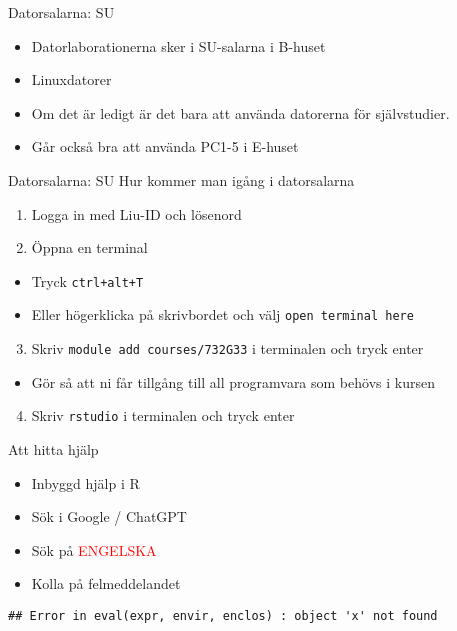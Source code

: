 \documentclass[
  10pt,
  ignorenonframetext,
]{beamer}
\providecommand{\tightlist}{%
  \setlength{\itemsep}{0pt}\setlength{\parskip}{0pt}}
\begin{document}
\begin{frame}{Datorsalarna: SU}
\protect\hypertarget{datorsalarna-su}{}
\begin{itemize}
\tightlist
\item
  Datorlaborationerna sker i SU-salarna i B-huset
\item
  Linuxdatorer
\item
  Om det är ledigt är det bara att använda datorerna för självstudier.
\item
  Går också bra att använda PC1-5 i E-huset
\end{itemize}
\end{frame}

\begin{frame}[fragile]{Datorsalarna: SU}
\protect\hypertarget{datorsalarna-su-1}{}
Hur kommer man igång i datorsalarna

\begin{enumerate}
\tightlist
\item
  Logga in med Liu-ID och lösenord
\item
  Öppna en terminal
\end{enumerate}

\begin{itemize}
\tightlist
\item
  Tryck \texttt{ctrl+alt+T}
\item
  Eller högerklicka på skrivbordet och välj
  \texttt{open\ terminal\ here}
\end{itemize}

\begin{enumerate}
\setcounter{enumi}{2}
\tightlist
\item
  Skriv \texttt{module\ add\ courses/732G33} i terminalen och tryck
  enter
\end{enumerate}

\begin{itemize}
\tightlist
\item
  Gör så att ni får tillgång till all programvara som behövs i kursen
\end{itemize}

\begin{enumerate}
\setcounter{enumi}{3}
\tightlist
\item
  Skriv \texttt{rstudio} i terminalen och tryck enter
\end{enumerate}
\end{frame}

\begin{frame}[fragile]{Att hitta hjälp}
\protect\hypertarget{att-hitta-hjuxe4lp}{}
\begin{itemize}
\tightlist
\item
  Inbyggd hjälp i R
\item
  Sök i Google / ChatGPT
\item
  Sök på \textcolor{red}{ENGELSKA}
\item
  Kolla på felmeddelandet
\end{itemize}

\begin{verbatim}
## Error in eval(expr, envir, enclos) : object 'x' not found
\end{verbatim}
\end{frame}
\end{document}
